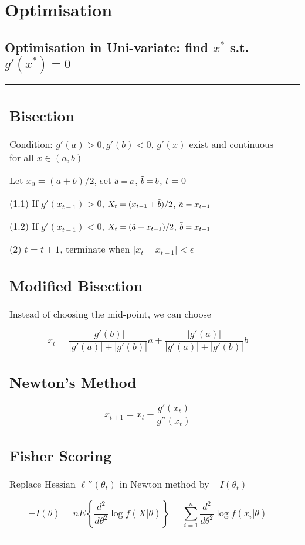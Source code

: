 \section{Optimisation}

\subsection{Optimisation in Uni-variate: find $x^*$ s.t. $g'(x^*)=0$}

\begin{tabulary}{\textwidth}{l L}

\subsection{Bisection}

Condition: $g'(a) > 0 , g'(b) < 0$, $g'(x)$ exist and continuous for all $x\in(a, b)$

Let $x_0 = (a+b)/2$, set $\Tilde{a}=a$, $\Tilde{b}=b$, $t=0$

(1.1) If $g'(x_{t-1}) > 0$, $X_t = (x_{t-1} + \Tilde{b}) / 2$, $\Tilde{a} = x_{t-1}$

(1.2) If $g'(x_{t-1}) < 0$, $X_t = (\Tilde{a} + x_{t-1}) / 2$, $\Tilde{b} = x_{t-1}$

(2) $t = t + 1$, terminate when $|x_t - x_{t-1}| < \epsilon$

\subsection{Modified Bisection}

Instead of choosing the mid-point, we can choose

$$
x_t = \frac{|g'(b)|}{|g'(a)| + |g'(b)|} a
+ \frac{|g'(a)|}{|g'(a)| + |g'(b)|} b
$$


\subsection{Newton's Method}

$$
x_{t+1} = x_t - \frac{g'(x_t)}{g''(x_t)}
$$

\subsection{Fisher Scoring}

Replace Hessian $\ell''(\theta_t)$ in Newton method by $-I(\theta_t)$

$$
-I(\theta) = nE\left\{
    \frac{d^2}{d\theta^2} \log f(X|\theta)
\right\} =  \sum_{i=1}^n \frac{d^2}{d\theta^2} \log f(x_i|\theta)
$$



\end{tabulary}
